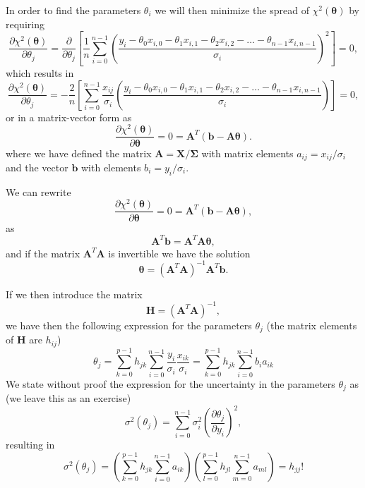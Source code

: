 \documentclass[%
oneside,                 %
final,                   %
10pt]{article}
\newenvironment{block_mdfboxadmon}[1][]{
\begin{block_mdfboxmdframed}[frametitle=#1]
}
{
\end{block_mdfboxmdframed}
}
\begin{document}

\begin{block_mdfboxadmon}[]

In order to find the parameters $\theta_i$ we will then minimize the spread of $\chi^2(\bm{\theta})$ by requiring
\[
\frac{\partial \chi^2(\bm{\theta})}{\partial \theta_j} = \frac{\partial }{\partial \theta_j}\left[ \frac{1}{n}\sum_{i=0}^{n-1}\left(\frac{y_i-\theta_0x_{i,0}-\theta_1x_{i,1}-\theta_2x_{i,2}-\dots-\theta_{n-1}x_{i,n-1}}{\sigma_i}\right)^2\right]=0, 
\]
which results in
\[
\frac{\partial \chi^2(\bm{\theta})}{\partial \theta_j} = -\frac{2}{n}\left[ \sum_{i=0}^{n-1}\frac{x_{ij}}{\sigma_i}\left(\frac{y_i-\theta_0x_{i,0}-\theta_1x_{i,1}-\theta_2x_{i,2}-\dots-\theta_{n-1}x_{i,n-1}}{\sigma_i}\right)\right]=0, 
\]
or in a matrix-vector form as
\[
\frac{\partial \chi^2(\bm{\theta})}{\partial \bm{\theta}} = 0 = \bm{A}^T\left( \bm{b}-\bm{A}\bm{\theta}\right).  
\]
where we have defined the matrix $\bm{A} =\bm{X}/\bm{\Sigma}$ with matrix elements $a_{ij} = x_{ij}/\sigma_i$ and the vector $\bm{b}$ with elements $b_i = y_i/\sigma_i$.
\end{block_mdfboxadmon} %




\begin{block_mdfboxadmon}[]

We can rewrite
\[
\frac{\partial \chi^2(\bm{\theta})}{\partial \bm{\theta}} = 0 = \bm{A}^T\left( \bm{b}-\bm{A}\bm{\theta}\right),  
\]
as
\[
\bm{A}^T\bm{b} = \bm{A}^T\bm{A}\bm{\theta},  
\]
and if the matrix $\bm{A}^T\bm{A}$ is invertible we have the solution
\[
\bm{\theta} =\left(\bm{A}^T\bm{A}\right)^{-1}\bm{A}^T\bm{b}.
\]
\end{block_mdfboxadmon} %




\begin{block_mdfboxadmon}[]

If we then introduce the matrix
\[
\bm{H} =  \left(\bm{A}^T\bm{A}\right)^{-1},
\]
we have then the following expression for the parameters $\theta_j$ (the matrix elements of $\bm{H}$ are $h_{ij}$)
\[
\theta_j = \sum_{k=0}^{p-1}h_{jk}\sum_{i=0}^{n-1}\frac{y_i}{\sigma_i}\frac{x_{ik}}{\sigma_i} = \sum_{k=0}^{p-1}h_{jk}\sum_{i=0}^{n-1}b_ia_{ik}
\]
We state without proof the expression for the uncertainty  in the parameters $\theta_j$ as (we leave this as an exercise)
\[
\sigma^2(\theta_j) = \sum_{i=0}^{n-1}\sigma_i^2\left( \frac{\partial \theta_j}{\partial y_i}\right)^2, 
\]
resulting in 
\[
\sigma^2(\theta_j) = \left(\sum_{k=0}^{p-1}h_{jk}\sum_{i=0}^{n-1}a_{ik}\right)\left(\sum_{l=0}^{p-1}h_{jl}\sum_{m=0}^{n-1}a_{ml}\right) = h_{jj}!
\]
\end{block_mdfboxadmon} %
\end{document}
